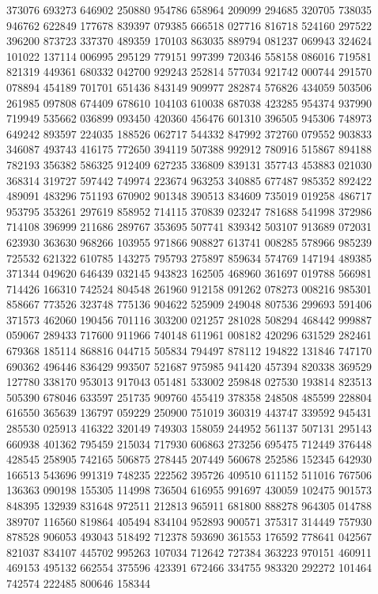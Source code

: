 {373076 693273 646902 250880 954786 658964 209099 294685 320705 738035 946762%
622849 177678 839397 079385 666518 027716 816718 524160 297522 396200 873723%
337370 489359 170103 863035 889794 081237 069943 324624 101022 137114 006995%
295129 779151 997399 720346 558158 086016 719581 821319 449361 680332 042700%
929243 252814 577034 921742 000744 291570 078894 454189 701701 651436 843149%
909977 282874 576826 434059 503506 261985 097808 674409 678610 104103 610038%
687038 423285 954374 937990 719949 535662 036899 093450 420360 456476 601310%
396505 945306 748973 649242 893597 224035 188526 062717 544332 847992 372760%
079552 903833 346087 493743 416175 772650 394119 507388 992912 780916 515867%
894188 782193 356382 586325 912409 627235 336809 839131 357743 453883 021030%
368314 319727 597442 749974 223674 963253 340885 677487 985352 892422 489091%
483296 751193 670902 901348 390513 834609 735019 019258 486717 953795 353261%
297619 858952 714115 370839 023247 781688 541998 372986 714108 396999 211686%
289767 353695 507741 839342 503107 913689 072031 623930 363630 968266 103955%
971866 908827 613741 008285 578966 985239 725532 621322 610785 143275 795793%
275897 859634 574769 147194 489385 371344 049620 646439 032145 943823 162505%
468960 361697 019788 566981 714426 166310 742524 804548 261960 912158 091262%
078273 008216 985301 858667 773526 323748 775136 904622 525909 249048 807536%
299693 591406 371573 462060 190456 701116 303200 021257 281028 508294 468442%
999887 059067 289433 717600 911966 740148 611961 008182 420296 631529 282461%
679368 185114 868816 044715 505834 794497 878112 194822 131846 747170 690362%
496446 836429 993507 521687 975985 941420 457394 820338 369529 127780 338170%
953013 917043 051481 533002 259848 027530 193814 823513 505390 678046 633597%
251735 909760 455419 378358 248508 485599 228804 616550 365639 136797 059229%
250900 751019 360319 443747 339592 945431 285530 025913 416322 320149 749303%
158059 244952 561137 507131 295143 660938 401362 795459 215034 717930 606863%
273256 695475 712449 376448 428545 258905 742165 506875 278445 207449 560678%
252586 152345 642930 166513 543696 991319 748235 222562 395726 409510 611152%
511016 767506 136363 090198 155305 114998 736504 616955 991697 430059 102475%
901573 848395 132939 831648 972511 212813 965911 681800 888278 964305 014788%
389707 116560 819864 405494 834104 952893 900571 375317 314449 757930 878528%
906053 493043 518492 712378 593690 361553 176592 778641 042567 821037 834107%
445702 995263 107034 712642 727384 363223 970151 460911 469153 495132 662554%
375596 423391 672466 334755 983320 292272 101464 742574 222485 800646 158344%
}
